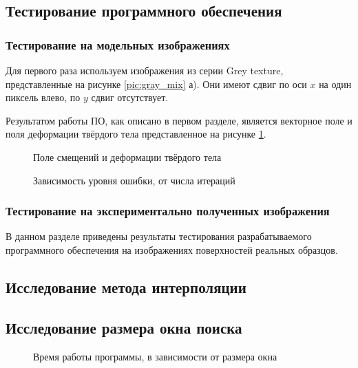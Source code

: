 

\subsection{Тестирование программного обеспечения}
\subsubsection{Тестирование на модельных изображениях}

Для первого раза используем изображения из серии Grey texture, представленные на рисунке \ref{pic:gray_mix} а). Они имеют сдвиг по оси $x$ на один пиксель влево, по $y$ сдвиг отсутствует.

Результатом работы ПО, как описано в первом разделе, является векторное поле и поля деформации твёрдого тела представленное на рисунке \ref{pic:gray_set_out}.

\begin{figure}[h!]
\caption{Поле смещений и деформации твёрдого тела}
\label{pic:gray_set_out}
\end{figure}

\begin{figure}[h!]
\caption{Зависимость уровня ошибки, от числа итераций}
\label{pic:gray_set_func_iteration}
\end{figure}

\subsubsection{Тестирование на экспериментально полученных изображения}
В данном разделе приведены результаты тестирования разрабатываемого программного обеспечения на изображениях поверхностей реальных образцов.

\subsection{Исследование метода интерполяции}

\subsection{Исследование размера окна поиска}
\begin{figure}[h!]
\caption{Время работы программы, в зависимости от размера окна}
\label{pic:window_time}
\end{figure}

